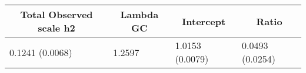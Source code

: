 \begin{center}
\begin{tabular}{llll}
\hline\hline
\multicolumn{1}{c}{Total Observed scale h2}&\multicolumn{1}{c}{Lambda GC}&\multicolumn{1}{c}{Intercept}&\multicolumn{1}{c}{Ratio}\tabularnewline
\hline
0.1241 (0.0068)&1.2597&1.0153 (0.0079)&0.0493 (0.0254)\tabularnewline
\hline
\end{tabular}\end{center}
